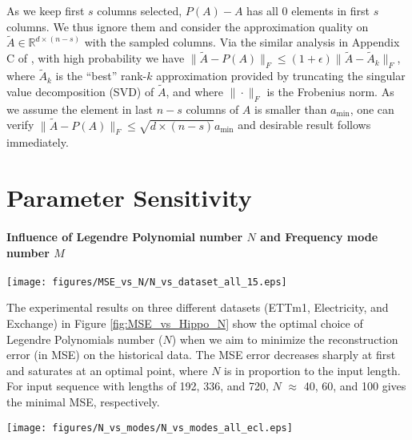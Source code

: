 \documentclass{article}
\begin{document}
As we keep first $s$ columns selected, $P(A)-A$ has all $0$ elements in first $s$ columns. We thus ignore them and consider the approximation quality on $\tilde{A}\in\mathbb{R}^{d\times (n-s)}$ with the sampled columns.  Via the similar analysis in Appendix C of \cite{FedFormer}, with high probability we have $\| \tilde{A}-P(A) \|_F \leq (1+\epsilon) \|\tilde{A} - \tilde{A}_k\|_F$, where $\tilde{A}_k$ is the ``best” rank-$k$ approximation provided by truncating the singular value decomposition (SVD) of $\tilde{A}$, and where $\|\cdot\|_F$
is the Frobenius norm. As we assume the element in last $n - s$ columns of $A$ is smaller than $a_{\min}$, one can verify  $\| \tilde{A}-P(A) \|_F\le \sqrt{d \times (n-s)}a_{\min}$ and desirable result follows immediately.  



 \section{Parameter Sensitivity}
\label{app:parameter}
\paragraph{Influence of Legendre Polynomial number $N$ and Frequency mode number $M$}
\begin{figure*}[h]
    \centering
    \texttt{[image: figures/MSE\_vs\_N/N\_vs\_dataset\_all\_15.eps]}
\caption{The reconstruction error (MSE) vs. Legendre Polynomial number ($N$) on three datasets with three different input lengths.}
    \label{fig:MSE_vs_Hippo_N}
\end{figure*}
The experimental results on three different datasets (ETTm1, Electricity, and Exchange) in Figure \ref{fig:MSE_vs_Hippo_N} show the optimal choice of Legendre Polynomials number ($N$) when we aim to minimize the reconstruction error (in MSE) on the historical data. The MSE error decreases sharply at first and saturates at an optimal point, where $N$ is in proportion to the input length. For input sequence with lengths of 192, 336, and 720, $N$ $\approx$ 40, 60, and 100 gives the minimal MSE,  respectively. 

\begin{figure*}[h]
    \centering
\texttt{[image: figures/N\_vs\_modes/N\_vs\_modes\_all\_ecl.eps]}
\caption{The MSE error of univariate time series forecasting task on Electricity dataset with different Legendre Polynomials number ($N$), mode number and input length. Left: input length = 192. Mid: input length = 336. Right: input length = 720.}
    \label{fig:MSE_vs_modes_vs_N}
\end{figure*}
\end{document}
